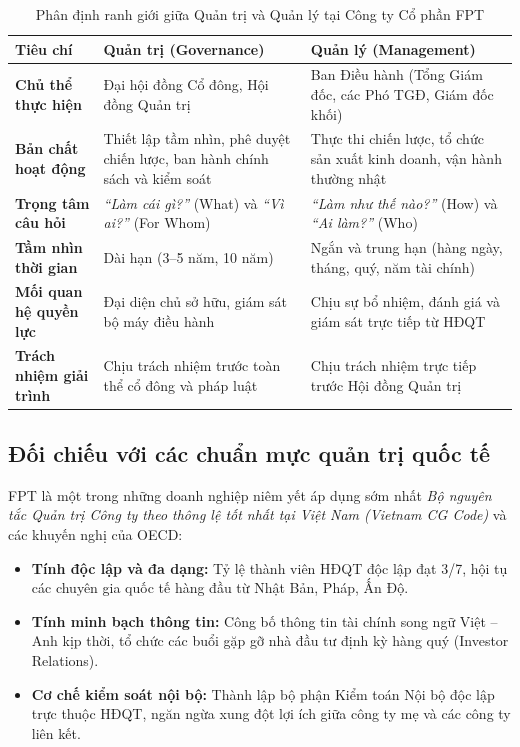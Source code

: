 \begin{table}[htbp]
\centering
\caption{Phân định ranh giới giữa Quản trị và Quản lý tại Công ty Cổ phần FPT}
\label{tab:so_sanh_quan_tri_quan_ly}
\begin{tabularx}{\textwidth}{p{3.2cm} X X}
\toprule
\textbf{Tiêu chí} & \textbf{Quản trị (Governance)} & \textbf{Quản lý (Management)} \\
\midrule
\textbf{Chủ thể thực hiện} & Đại hội đồng Cổ đông, Hội đồng Quản trị & Ban Điều hành (Tổng Giám đốc, các Phó TGĐ, Giám đốc khối) \\
\textbf{Bản chất hoạt động} & Thiết lập tầm nhìn, phê duyệt chiến lược, ban hành chính sách và kiểm soát & Thực thi chiến lược, tổ chức sản xuất kinh doanh, vận hành thường nhật \\
\textbf{Trọng tâm câu hỏi} & \textit{``Làm cái gì?''} (What) và \textit{``Vì ai?''} (For Whom) & \textit{``Làm như thế nào?''} (How) và \textit{``Ai làm?''} (Who) \\
\textbf{Tầm nhìn thời gian} & Dài hạn (3--5 năm, 10 năm) & Ngắn và trung hạn (hàng ngày, tháng, quý, năm tài chính) \\
\textbf{Mối quan hệ quyền lực} & Đại diện chủ sở hữu, giám sát bộ máy điều hành & Chịu sự bổ nhiệm, đánh giá và giám sát trực tiếp từ HĐQT \\
\textbf{Trách nhiệm giải trình} & Chịu trách nhiệm trước toàn thể cổ đông và pháp luật & Chịu trách nhiệm trực tiếp trước Hội đồng Quản trị \\
\bottomrule
\end{tabularx}
\end{table}

\subsection{Đối chiếu với các chuẩn mực quản trị quốc tế}
FPT là một trong những doanh nghiệp niêm yết áp dụng sớm nhất \textit{Bộ nguyên tắc Quản trị Công ty theo thông lệ tốt nhất tại Việt Nam (Vietnam CG Code)} và các khuyến nghị của OECD:
\begin{itemize}
    \item \textbf{Tính độc lập và đa dạng:} Tỷ lệ thành viên HĐQT độc lập đạt 3/7, hội tụ các chuyên gia quốc tế hàng đầu từ Nhật Bản, Pháp, Ấn Độ.
    \item \textbf{Tính minh bạch thông tin:} Công bố thông tin tài chính song ngữ Việt -- Anh kịp thời, tổ chức các buổi gặp gỡ nhà đầu tư định kỳ hàng quý (Investor Relations).
    \item \textbf{Cơ chế kiểm soát nội bộ:} Thành lập bộ phận Kiểm toán Nội bộ độc lập trực thuộc HĐQT, ngăn ngừa xung đột lợi ích giữa công ty mẹ và các công ty liên kết.
\end{itemize}
